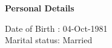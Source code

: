 \documentclass[a4paper,10pt]{memoir} %
\newcommand{\userinformation}[1]{\renewcommand{\userinformation}{#1}} %
\newcommand{\Sep}{\vspace{1em}} %
\newcommand{\SmallSep}{\vspace{0.5em}} %
\newcommand{\CVSection}[1]{ %
{\Large\textbf{#1}}\par
\SmallSep %
}
\newcommand{\CVItem}[2]{ %
\textbf{\color{RoyalBlue} #1}\par
#2
\SmallSep %
}
\begin{document}
\Sep %










\CVSection{Personal Details} 
{Date of Birth : 04-Oct-1981 \\ 
 Marital status: Married}
 
\Sep %
 






\end{document}
